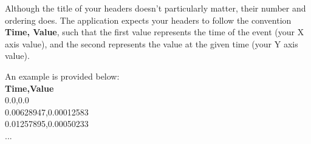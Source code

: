 Although the title of your headers doesn't particularly matter, their number and ordering does. The application expects your headers to follow the convention {\bf Time, Value}, such that the first value represents the time of the event (your X axis value), and the second represents the value at the given time (your Y axis value). 

An example is provided below: \\ 
{\bf Time,Value} \\
0.0,0.0 \\
0.00628947,0.00012583 \\
0.01257895,0.00050233 \\
... \\
